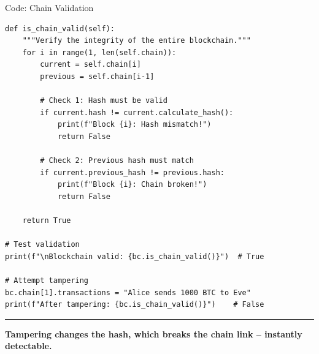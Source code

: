 \documentclass[8pt,aspectratio=169]{beamer}
\newcommand{\bottomnote}[1]{%
\vfill
\vspace{-2mm}
\textcolor{mllavender2}{\rule{\textwidth}{0.4pt}}
\vspace{1mm}
\footnotesize
\textbf{#1}
}
\begin{document}
\begin{frame}[fragile]{Code: Chain Validation}
\begin{lstlisting}[style=python]
def is_chain_valid(self):
    """Verify the integrity of the entire blockchain."""
    for i in range(1, len(self.chain)):
        current = self.chain[i]
        previous = self.chain[i-1]

        # Check 1: Hash must be valid
        if current.hash != current.calculate_hash():
            print(f"Block {i}: Hash mismatch!")
            return False

        # Check 2: Previous hash must match
        if current.previous_hash != previous.hash:
            print(f"Block {i}: Chain broken!")
            return False

    return True

# Test validation
print(f"\nBlockchain valid: {bc.is_chain_valid()}")  # True

# Attempt tampering
bc.chain[1].transactions = "Alice sends 1000 BTC to Eve"
print(f"After tampering: {bc.is_chain_valid()}")    # False
\end{lstlisting}

\bottomnote{Tampering changes the hash, which breaks the chain link -- instantly detectable.}
\end{frame}
\end{document}
